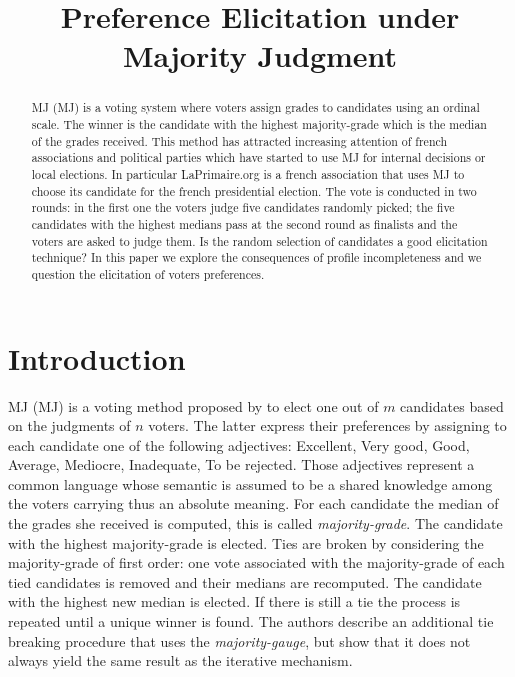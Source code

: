 \documentclass[version=3.21, pagesize, twoside=off, bibliography=totoc, DIV=calc, fontsize=12pt, a4paper]{scrartcl}
\title{Preference Elicitation under Majority Judgment}
\author{}
\begin{document}
\maketitle

\begin{abstract}
\acl{MJ} (\acs{MJ}) is a voting system where voters assign grades to candidates using an ordinal scale. The winner is the candidate with the highest majority-grade \textemdash which is the median of the grades received. This method has attracted increasing attention of french associations and political parties which have started to use \acs{MJ} for internal decisions or local elections. In particular LaPrimaire.org is a french association that uses \acs{MJ} to choose its candidate for the french presidential election. The vote is conducted in two rounds: in the first one the voters judge five candidates randomly picked; the five candidates with the highest medians pass at the second round as finalists and the voters are asked to judge them. Is the random selection of candidates a good elicitation technique? In this paper we explore the consequences of profile incompleteness and we question the elicitation of voters preferences.
\end{abstract}

\section{Introduction}
\label{sec:intro}
\acl{MJ} (\acs{MJ}) is a voting method proposed by \citet{Balinski2007,Balinski2011} to elect one out of $m$ candidates based on the judgments of $n$ voters. The latter express their preferences by assigning to each candidate one of the following adjectives: Excellent, Very good, Good, Average, Mediocre, Inadequate, To be rejected. Those adjectives represent a common language whose semantic is assumed to be a shared knowledge among the voters carrying thus an absolute meaning. For each candidate the median of the grades she received is computed, this is called \textit{majority-grade}. The candidate with the highest majority-grade is elected. Ties are broken by considering the majority-grade of first order: one vote associated with the majority-grade of each tied candidates is removed and their medians are recomputed. The candidate with the highest new median is elected. If there is still a tie the process is repeated until a unique winner is found. The authors describe an additional tie breaking procedure that uses the \textit{majority-gauge}, but \citet{Felsenthal2008} show that it does not always yield the same result as the iterative mechanism. 
\end{document}
